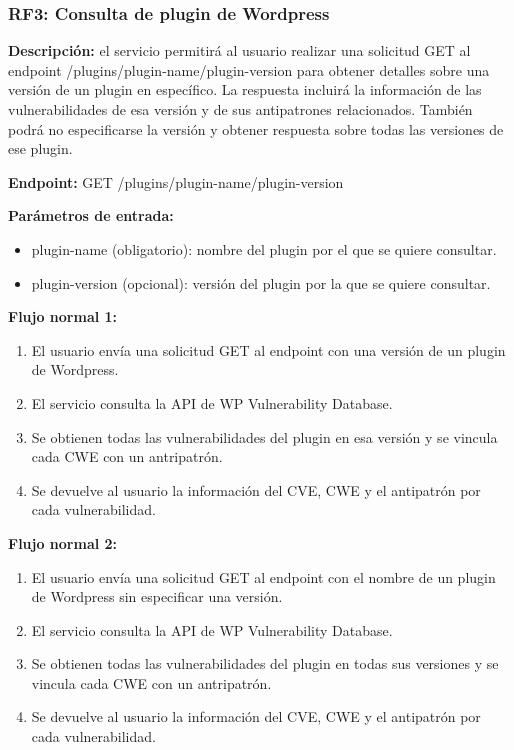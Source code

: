 \subsubsection{RF3: Consulta de plugin de Wordpress}

\textbf{Descripción:} el servicio permitirá al usuario realizar una solicitud GET al endpoint /plugins/{plugin-name}/{plugin-version} para obtener detalles sobre una versión de un plugin en específico. La respuesta incluirá la información de las vulnerabilidades de esa versión y de sus antipatrones relacionados. También podrá no especificarse la versión y obtener respuesta sobre todas las versiones de ese plugin.

\textbf{Endpoint:} GET /plugins/{plugin-name}/{plugin-version}

\textbf{Parámetros de entrada: }

\begin{itemize}
    \item plugin-name (obligatorio): nombre del plugin por el que se quiere consultar.
    \item plugin-version (opcional): versión del plugin por la que se quiere consultar.
\end{itemize}

\textbf{Flujo normal 1:}

\begin{enumerate}
    \item El usuario envía una solicitud GET al endpoint con una versión de un plugin de Wordpress.
    \item El servicio consulta la API de WP Vulnerability Database.
    \item Se obtienen todas las vulnerabilidades del plugin en esa versión y se vincula cada CWE con un antripatrón.
    \item Se devuelve al usuario la información del CVE, CWE y el antipatrón por cada vulnerabilidad.
\end{enumerate}

\textbf{Flujo normal 2:}

\begin{enumerate}
    \item El usuario envía una solicitud GET al endpoint con el nombre de un plugin de Wordpress sin especificar una versión.
    \item El servicio consulta la API de WP Vulnerability Database.
    \item Se obtienen todas las vulnerabilidades del plugin en todas sus versiones y se vincula cada CWE con un antripatrón.
    \item Se devuelve al usuario la información del CVE, CWE y el antipatrón por cada vulnerabilidad.
\end{enumerate}

